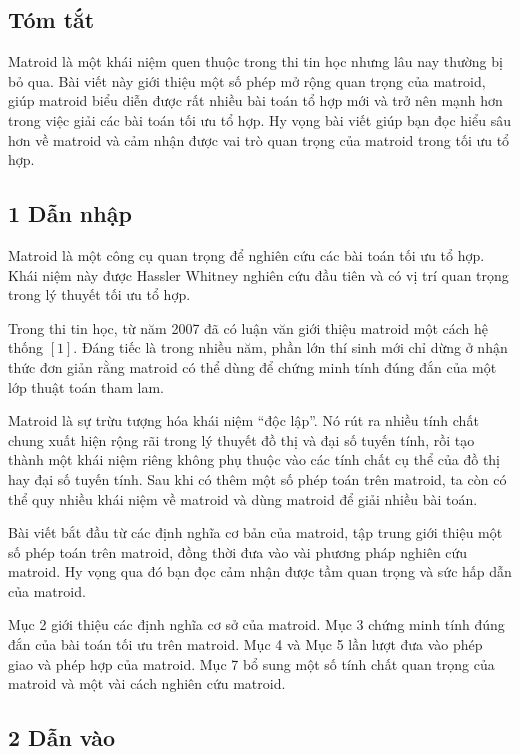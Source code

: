 \documentclass[11pt]{article}
\begin{document}
\subsection*{Tóm tắt}

Matroid là một khái niệm quen thuộc trong thi tin học nhưng lâu nay thường bị
bỏ qua. Bài viết này giới thiệu một số phép mở rộng quan trọng của matroid, giúp
matroid biểu diễn được rất nhiều bài toán tổ hợp mới và trở nên mạnh hơn trong
việc giải các bài toán tối ưu tổ hợp. Hy vọng bài viết giúp bạn đọc hiểu sâu hơn
về matroid và cảm nhận được vai trò quan trọng của matroid trong tối ưu tổ hợp.

\subsection*{1 Dẫn nhập}

Matroid là một công cụ quan trọng để nghiên cứu các bài toán tối ưu tổ hợp.
Khái niệm này được Hassler Whitney nghiên cứu đầu tiên và có vị trí quan trọng
trong lý thuyết tối ưu tổ hợp.

Trong thi tin học, từ năm 2007 đã có luận văn giới thiệu matroid một cách hệ
thống \([1]\). Đáng tiếc là trong nhiều năm, phần lớn thí sinh mới chỉ dừng ở
nhận thức đơn giản rằng matroid có thể dùng để chứng minh tính đúng đắn của một
lớp thuật toán tham lam.

Matroid là sự trừu tượng hóa khái niệm ``độc lập''. Nó rút ra nhiều tính chất
chung xuất hiện rộng rãi trong lý thuyết đồ thị và đại số tuyến tính, rồi tạo
thành một khái niệm riêng không phụ thuộc vào các tính chất cụ thể của đồ thị
hay đại số tuyến tính. Sau khi có thêm một số phép toán trên matroid, ta còn có
thể quy nhiều khái niệm về matroid và dùng matroid để giải nhiều bài toán.

Bài viết bắt đầu từ các định nghĩa cơ bản của matroid, tập trung giới thiệu một
số phép toán trên matroid, đồng thời đưa vào vài phương pháp nghiên cứu matroid.
Hy vọng qua đó bạn đọc cảm nhận được tầm quan trọng và sức hấp dẫn của matroid.

Mục 2 giới thiệu các định nghĩa cơ sở của matroid. Mục 3 chứng minh tính đúng
đắn của bài toán tối ưu trên matroid. Mục 4 và Mục 5 lần lượt đưa vào phép giao
và phép hợp của matroid. Mục 7 bổ sung một số tính chất quan trọng của matroid
và một vài cách nghiên cứu matroid.

\subsection*{2 Dẫn vào}
\end{document}

